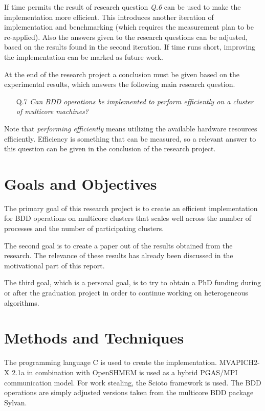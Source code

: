 If time permits the result of research question \textit{Q.6} can be used to make the implementation more efficient. This introduces another iteration of implementation and benchmarking (which requires the measurement plan to be re-applied). Also the answers given to the research questions can be adjusted, based on the results found in the second iteration. If time runs short, improving the implementation can be marked as future work.

At the end of the research project a conclusion must be given based on the experimental results, which answers the following main research question. 

\begin{enumerate}
	\item[Q.7]{\textit{Can BDD operations be implemented to perform efficiently on a cluster of multicore machines?}}
\end{enumerate}

Note that \textit{performing efficiently} means utilizing the available hardware resources efficiently. Efficiency is something that can be measured, so a relevant answer to this question can be given in the conclusion of the research project.

\section{Goals and Objectives}
The primary goal of this research project is to create an efficient implementation for BDD operations on multicore clusters that scales well across the number of processes and the number of participating clusters. 

The second goal is to create a paper out of the results obtained from the research. The relevance of these results has already been discussed in the motivational part of this report.

The third goal, which is a personal goal, is to try to obtain a PhD funding during or after the graduation project in order to continue working on heterogeneous algorithms.

\section{Methods and Techniques}
The programming language C is used to create the implementation. MVAPICH2-X 2.1a in combination with OpenSHMEM is used as a hybrid PGAS/MPI communication model. For work stealing, the Scioto framework is used. The BDD operations are simply adjusted versions taken from the multicore BDD package Sylvan.

